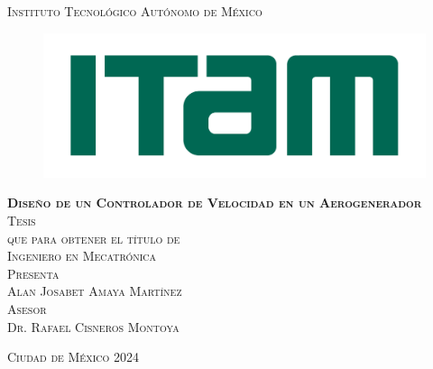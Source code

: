 \documentclass[11pt, oneside]{book} %
\begin{document}
\begin{titlepage}
\begin{center}
\textsc{\Large Instituto Tecnológico Autónomo de México}\\[1em]

\begin{figure}[h]
\begin{center}
\includegraphics[scale=0.15]{logo-ITAM.png}
\end{center}
\end{figure}

\textsc{\huge \textbf{Diseño de un Controlador de Velocidad en un Aerogenerador}}\\[2em]

\textsc{\large Tesis}\\[1em]
\textsc{\large que para obtener el título de}\\[1em]
\textsc{\large Ingeniero en Mecatrónica}\\[1em]
\textsc{\large Presenta}\\[1em]
\textsc{\Large Alan Josabet Amaya Martínez}\\[1em]
\textsc{\large Asesor}\\[1em]
\textsc{\large Dr. Rafael Cisneros Montoya}\\[1em]
  
\end{center}
\vspace*{\fill}
\textsc{Ciudad de México \hspace*{\fill} 2024}
\end{titlepage}

\tableofcontents %
\mainmatter %



%
%
%
\end{document}
